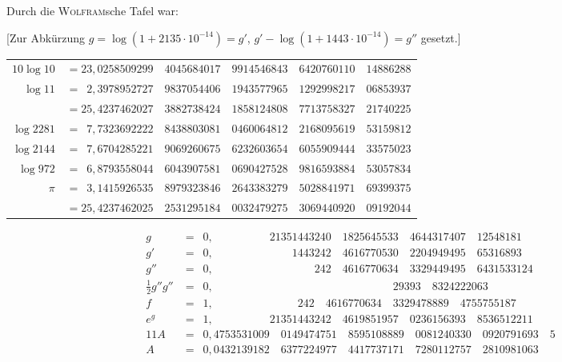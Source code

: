 \documentclass[10pt,a4paper]{article}
\begin{document}
Durch die \textsc{Wolfram}sche Tafel war:

[Zur Abkürzung $g=\log(1+2135\cdot10^{-14})=g'$, $g'-\log(1+1443\cdot10^{-14})=g''$ gesetzt.]

\begin{center}
\begin{tabular}{r@{\,\,}l}
$10\log 10$ &$= 23{,}0258509299\quad 4045684017\quad 9914546843\quad 6420760110\quad 14886288$\\
$\log 11$ &$=\phantom{0}2{,}3978952727\quad 9837054406\quad 1943577965\quad 1292998217\quad 06853937$\\
\hline
&$= 25{,}4237462027\quad 3882738424\quad 1858124808\quad 7713758327\quad 21740225$\\
$\log 2281$ &$=\phantom{0}7{,}7323692222\quad 8438803081\quad 0460064812\quad 2168095619\quad 53159812$\\
$\log 2144$ &$=\phantom{0}7{,}6704285221\quad 9069260675\quad 6232603654\quad 6055909444\quad 33575023$\\
$\log 972$ &$=\phantom{0}6{,}8793558044\quad 6043907581\quad 0690427528\quad 9816593884\quad 53057834$\\
$\pi$ &$=\phantom{0}3{,}1415926535\quad 8979323846\quad 2643383279\quad 5028841971\quad 69399375$\\
\hline
&$= 25{,}4237462025\quad 2531295184\quad 0032479275\quad 3069440920\quad 09192044$
\end{tabular}
\end{center}

\begin{align*}
g &= \phantom{0}0{,}\phantom{0000000000}21351443240\quad 1825645533\quad 4644317407\quad 12548181\\
g'&= \phantom{0}0{,}\phantom{00000000000000}1443242\quad 4616770530\quad 2204949495\quad 65316893\\
g''&= \phantom{0}0{,}\phantom{000000000000000000}242\quad 4616770634\quad 3329449495\quad 6431533124\\
\tfrac12g''g''&= \phantom{0}0{,}\phantom{00000000000000000000000000000000}29393\quad 8324222063\\
f &= \phantom{0}1{,}\phantom{000000000000000}242\quad 4616770634\quad 3329478889\quad 4755755187\\
e^g&= \phantom{0}1{,}\phantom{0000000000}21351443242\quad 4619851957\quad 0236156393\quad 8536512211\\
11A &= \phantom{0}0{,}4753531009\quad 0149474751\quad 8595108889\quad 0081240330\quad 0920791693\quad 5\\
A &= \phantom{0}0{,}0432139182\quad 6377224977\quad 4417737171\quad 7280112757\quad 2810981063
\end{align*}
\end{document}
